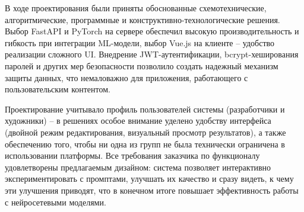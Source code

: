 В ходе проектирования были приняты обоснованные схемотехнические, алгоритмические, программные и конструктивно-технологические решения. Выбор FastAPI и PyTorch на сервере обеспечил высокую производительность и гибкость при интеграции ML-модели, выбор Vue.js на клиенте – удобство реализации сложного UI. Внедрение JWT-аутентификации, bcrypt-хеширования паролей и других мер безопасности позволило создать надежный механизм защиты данных, что немаловажно для приложения, работающего с пользовательским контентом.

Проектирование учитывало профиль пользователей системы (разработчики и художники) – в решениях особое внимание уделено удобству интерфейса (двойной режим редактирования, визуальный просмотр результатов), а также обеспечению того, чтобы ни одна из групп не была технически ограничена в использовании платформы. Все требования заказчика по функционалу удовлетворены предлагаемым дизайном: система позволяет интерактивно экспериментировать с промптами, улучшать их качество и сразу видеть, к чему эти улучшения приводят, что в конечном итоге повышает эффективность работы с нейросетевыми моделями.
